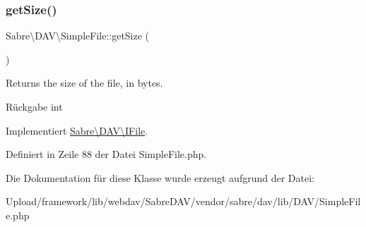 \subsubsection{\texorpdfstring{get\+Size()}{getSize()}}
{\footnotesize\ttfamily Sabre\textbackslash{}\+D\+A\+V\textbackslash{}\+Simple\+File\+::get\+Size (\begin{DoxyParamCaption}{ }\end{DoxyParamCaption})}

Returns the size of the file, in bytes.

\begin{DoxyReturn}{Rückgabe}
int 
\end{DoxyReturn}


Implementiert \mbox{\hyperlink{interface_sabre_1_1_d_a_v_1_1_i_file_aa1534e00805f45d9282de9c699dbe178}{Sabre\textbackslash{}\+D\+A\+V\textbackslash{}\+I\+File}}.



Definiert in Zeile 88 der Datei Simple\+File.\+php.



Die Dokumentation für diese Klasse wurde erzeugt aufgrund der Datei\+:\begin{DoxyCompactItemize}
\item 
Upload/framework/lib/webdav/\+Sabre\+D\+A\+V/vendor/sabre/dav/lib/\+D\+A\+V/Simple\+File.\+php\end{DoxyCompactItemize}
